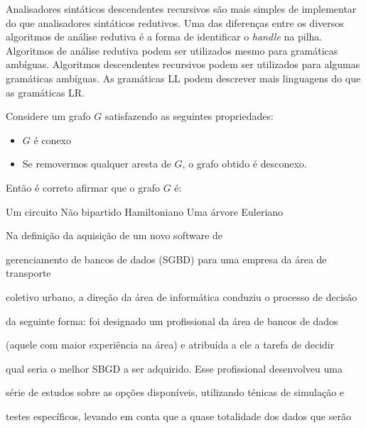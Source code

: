 \documentclass[12pt, addpoints]{exam}
\begin{document}
\begin{questions}
\begin{choices}
\choice Analisadores sintáticos descendentes recursivos são mais simples de implementar do que analisadores sintáticos redutivos.
\choice Uma das diferenças entre os diversos algoritmos de análise redutiva é a forma de identificar o \textit{handle} na pilha.
\choice Algoritmos de análise redutiva podem ser utilizados mesmo para gramáticas ambíguas.
\choice Algoritmos descendentes recursivos podem ser utilizados para algumas gramáticas ambíguas.
\choice As gramáticas LL podem descrever mais linguagens do que as gramáticas LR.
\end{choices}

\question

Considere um grafo \( G \) satisfazendo as seguintes propriedades:



\begin{itemize}

    \item \( G \) é conexo

    \item Se removermos qualquer aresta de \( G \), o grafo obtido é desconexo.

\end{itemize}



Então é correto afirmar que o grafo \( G \) é:
\begin{choices}
\choice Um circuito
\choice Não bipartido
\choice Hamiltoniano
\choice Uma árvore
\choice Euleriano
\end{choices}

\question

Na definição da aquisição de um novo software de

gerenciamento de bancos de dados (SGBD) para uma empresa da área de transporte 

coletivo urbano, a direção da área de informática conduziu o processo de decisão

da seguinte forma: foi designado um profissional da área de bancos de dados

(aquele com maior experiência na área) e atribuída a ele a tarefa de decidir

qual seria o melhor SBGD a ser adquirido. Esse profissional desenvolveu uma

série de estudos sobre as opções disponíveis, utilizando ténicas de simulação e

testes específicos, levando em conta que a quase totalidade dos dados que serão


\end{questions}
\end{document}
